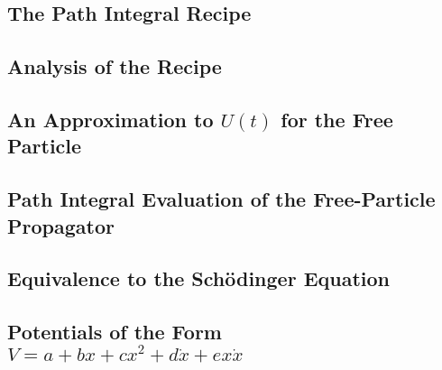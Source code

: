 \subsection{The Path Integral Recipe}

\subsection{Analysis of the Recipe}

\subsection{An Approximation to $U(t)$ for the Free Particle}

\subsection{Path Integral Evaluation of the Free-Particle Propagator}

\subsection{Equivalence to the Sch\"odinger Equation}

\subsection{Potentials of the Form $V = a + bx + cx^2 + d\dot{x} + ex\dot{x}$}
